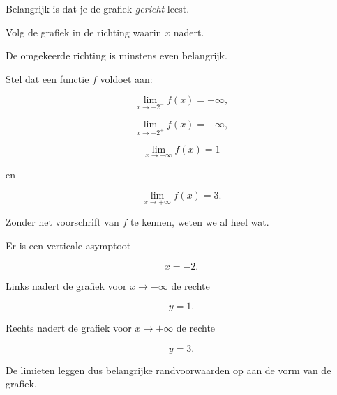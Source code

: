 \documentclass{ximera}
\begin{document}
Belangrijk is dat je de grafiek \emph{gericht} leest.

Volg de grafiek in de richting waarin $x$ nadert.




De omgekeerde richting is minstens even belangrijk.

Stel dat een functie $f$ voldoet aan:

\[
\lim_{x\to-2^-}f(x)=+\infty,
\]

\[
\lim_{x\to-2^+}f(x)=-\infty,
\]

\[
\lim_{x\to-\infty}f(x)=1
\]

en

\[
\lim_{x\to+\infty}f(x)=3.
\]

Zonder het voorschrift van $f$ te kennen, weten we al heel wat.

Er is een verticale asymptoot

\[
x=-2.
\]

Links nadert de grafiek voor $x\to-\infty$ de rechte

\[
y=1.
\]

Rechts nadert de grafiek voor $x\to+\infty$ de rechte

\[
y=3.
\]

De limieten leggen dus belangrijke randvoorwaarden op aan de vorm
van de grafiek.


\end{document}

